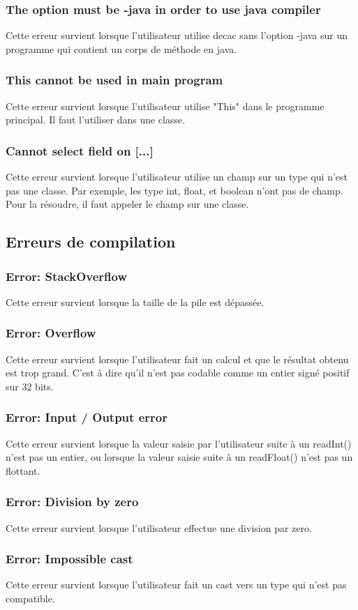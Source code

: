 \documentclass[12pt, a4paper, one side]{article}
\begin{document}
\subsubsection{The option must be -java in order to use java compiler}
Cette erreur survient lorsque l'utilisateur utilise decac sans l'option -java sur un programme qui contient un corps de méthode en java.

\subsubsection{This cannot be used in main program}
Cette erreur survient lorsque l'utilisateur utilise "This" dans le programme principal. Il faut l'utiliser dans une classe.

\subsubsection{Cannot select field on [...]}
Cette erreur survient lorsque l'utilisateur utilise un champ sur un type qui n'est pas une classe. Par exemple, les type int, float, et boolean n'ont pas de champ. Pour la résoudre, il faut appeler le champ sur une classe.


\subsection{Erreurs de compilation}
\subsubsection{Error: StackOverflow}
Cette erreur survient lorsque la taille de la pile est dépassée.

\subsubsection{Error: Overflow}
Cette erreur survient lorsque l'utilisateur fait un calcul et que le résultat obtenu est trop grand. C'est à dire qu'il n'est pas codable comme un entier signé positif sur 32 bits.

\subsubsection{Error: Input / Output error}
Cette erreur survient lorsque la  valeur saisie par l'utilisateur suite à un readInt() n'est pas un entier, ou lorsque la valeur saisie suite à un readFloat() n'est pas un flottant.

\subsubsection{Error: Division by zero}
Cette erreur survient lorsque l'utilisateur effectue une division par zero.

\subsubsection{Error: Impossible cast}
Cette erreur survient lorsque l'utilisateur fait un cast vers un type qui n'est pas compatible.
\end{document}
